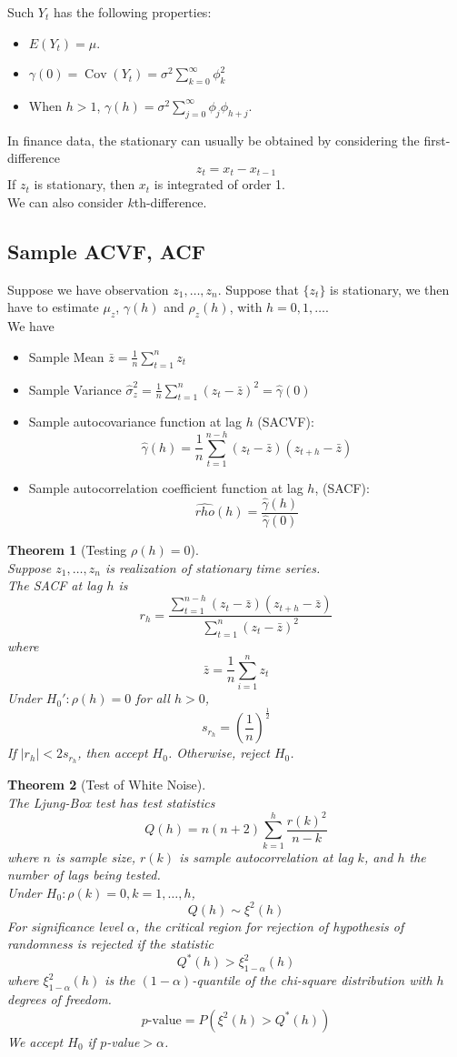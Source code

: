 \documentclass[12pt]{article}
\newtheorem{theorem}{Theorem}[section]
\theoremstyle{definition}
\DeclareMathOperator{\cov}{Cov}
\begin{document}
Such $Y_t$ has the following properties:
\begin{itemize}
  \item $E(Y_t)=\mu$.
  \item $\gamma(0)=\cov(Y_t)=\sigma^2\sum_{k=0}^\infty \phi_k^2$
  \item When $h>1$, $\gamma(h)=\sigma^2\sum_{j=0}^\infty \phi_j\phi_{h+j}$.
\end{itemize}
In finance data, the stationary can usually be obtained by considering the first-difference
\[
z_t = x_t  - x_{t-1}
\]
If $z_t$ is stationary, then $x_t$ is integrated of order 1.\\
We can also consider $k$th-difference.
\subsection{Sample ACVF, ACF}
Suppose we have observation $z_1,\ldots, z_n$. Suppose that $\{z_t\}$ is stationary, we then have to estimate $\mu_z$, $\gamma(h)$ and $\rho_z(h)$, with $h= 0,1,\ldots$.\\
We have
\begin{itemize}
  \item Sample Mean $\bar{z}=\frac{1}{n} \sum_{t=1}^n z_t$
  \item Sample Variance $\hat{\sigma}_z^2 = \frac{1}{n}\sum_{t=1}^n (z_t-\bar{z})^2 = \hat{\gamma}(0)$
  \item Sample autocovariance function at lag $h$ (SACVF):
  \[
\hat{\gamma}(h)=\frac{1}{n}\sum_{t=1}^{n-h} (z_t-\bar{z})(z_{t+h}-\bar{z})
  \]
  \item Sample autocorrelation coefficient function at lag $h$, (SACF):
  \[
\hat{rho}(h) = \frac{\hat{\gamma}(h)}{\hat{\gamma}(0)}
  \]
\end{itemize}
\begin{theorem}[Testing {$\rho(h)=0$}]
\hfill\\\normalfont Suppose $z_1,\ldots, z_n$ is realization of stationary time series.\\
The SACF at lag $h$ is
\[
r_h=\frac{\sum_{t=1}^{n-h} (z_t-\bar{z})(z_{t+h}-\bar{z})}{\sum_{t=1}^n (z_t-\bar{z})^2}
\]
where
\[
\bar{z}=\frac{1}{n}\sum_{i=1}^n z_t
\]
Under $H_0': \rho(h)=0$ for all $h>0$, 
\[
s_{r_h}=(\frac{1}{n})^{\frac{1}{2}}
\]
If $|r_h|<2s_{r_h}$, then accept $H_0$. Otherwise, reject $H_0$.
\end{theorem}
\begin{theorem}[Test of White Noise]
\hfill\\\normalfont 
The Ljung-Box test has test statistics 
\[
Q(h)=n(n+2)\sum_{k=1}^h \frac{r(k)^2}{n-k}
\]
where $n$ is sample size, $r(k)$ is sample autocorrelation at lag $k$, and $h$ the number of lags being tested.\\
Under $H_0: \rho(k)=0, k = 1,\ldots, h$,
\[
Q(h)\sim \xi^2(h)
\]
For significance level $\alpha$, the critical region for rejection of hypothesis of randomness is rejected if the statistic 
\[
Q^\ast(h)>\xi_{1-\alpha}^2(h)
\]
where $\xi^2_{1-\alpha}(h)$ is the $(1-\alpha)$-quantile of the chi-square distribution with $h$ degrees of freedom.\\
\[
p\text{-value} = P(\xi^2(h)>Q^\ast(h))
\]
We accept $H_0$ if $p$-value$>\alpha$.
\end{theorem}
\end{document}
